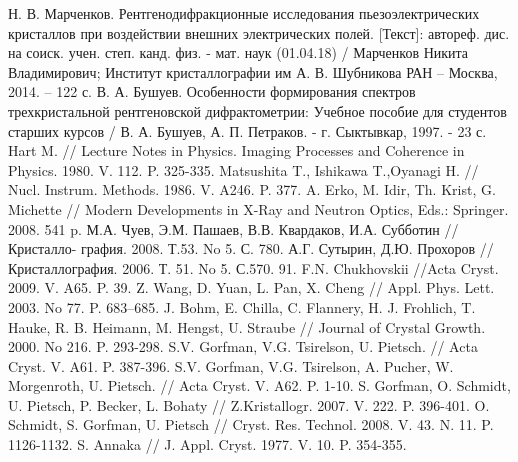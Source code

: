 \begin{thebibliography}{99}
    Н. В. Марченков. Рентгенодифракционные исследования пьезоэлектрических кристаллов
    при воздействии внешних электрических полей. [Текст]: автореф. дис. на соиск.
     учен. степ. канд. физ. - мат. наук (01.04.18) /
     Марченков Никита Владимирович; Институт кристаллографии им А. В. Шубникова РАН  – Москва, 2014. – 122 с.
     В. А. Бушуев. Особенности формирования спектров трехкристальной рентгеновской дифрактометрии:
    Учебное пособие для студентов старших курсов  / В. А. Бушуев, А. П. Петраков. - г. Сыктывкар, 1997. - 23 с.
      Hart M. // Lecture Notes in Physics. Imaging Processes and Coherence in Physics. 1980. V. 112. P. 325-335.
    Matsushita T., Ishikawa T.,Oyanagi H. // Nucl. Instrum. Methods. 1986. V. A246. P. 377.
      A. Erko, M. Idir, Th. Krist, G. Michette // Modern Developments in X-Ray and Neutron Optics, Eds.: Springer. 2008. 541 p.
    М.А. Чуев, Э.М. Пашаев, В.В. Квардаков, И.А. Субботин // Кристалло- графия. 2008. Т.53. No 5. С. 780.
А.Г. Сутырин, Д.Ю. Прохоров //Кристаллография. 2006. Т. 51. No 5. С.570. 91. F.N. Chukhovskii //Acta Cryst. 2009. V. A65. P. 39.
  Z. Wang, D. Yuan, L. Pan, X. Cheng // Appl. Phys. Lett. 2003. No 77. P. 683–685.
    J. Bohm, E. Chilla, C. Flannery, H. J. Frohlich, T. Hauke, R. B. Heimann, M. Hengst, U. Straube // Journal of Crystal Growth. 2000. No 216. P. 293-298.
  S.V. Gorfman, V.G. Tsirelson, U. Pietsch. // Acta Cryst. V. A61. P. 387-396.
  S.V. Gorfman, V.G. Tsirelson, A. Pucher, W. Morgenroth, U. Pietsch. // Acta Cryst. V. A62. P. 1-10.
  S. Gorfman, O. Schmidt, U. Pietsch, P. Becker, L. Bohaty // Z.Kristallogr. 2007. V. 222. P. 396-401.
  O. Schmidt, S. Gorfman, U. Pietsch // Cryst. Res. Technol. 2008. V. 43. N. 11. P. 1126-1132.
  S. Annaka // J. Appl. Cryst. 1977. V. 10. P. 354-355.
\end{thebibliography}
